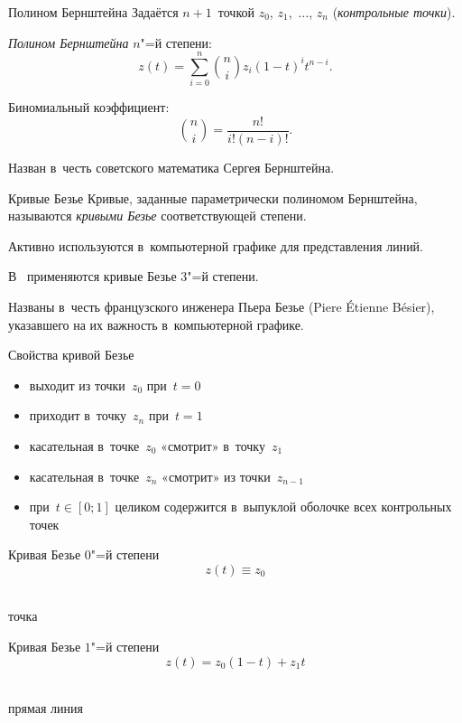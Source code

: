 
\begin{frame}{Полином Бернштейна}
Задаётся $n+1$~точкой $z_0$, $z_1$,~$\ldots$, $z_n$
(\emph{контрольные точки}).

\emph{Полином Бернштейна\/} $n$"=й степени:
	\[
	z(t)=\sum_{i=0}^n\binom niz_i(1-t)^it^{n-i}.
	\]

Биномиальный коэффициент:
	\[
	\binom ni=\frac{n!}{i!(n-i)!}.
	\]

Назван в~честь советского математика Сергея Бернштейна.
\end{frame}

\begin{frame}{Кривые Безье}
Кривые, заданные параметрически полиномом Бернштейна, называются \emph{кривыми
Безье\/} соответствующей степени.

Активно используются в~компьютерной графике для представления линий.

В~ применяются кривые Безье $3$"=й степени.

Названы в~честь французского инженера Пьера Безье (Piere Étienne Bésier),
указавшего на их важность в~компьютерной графике.
\end{frame}

\begin{frame}{Свойства кривой Безье}
\begin{itemize}
\item
выходит из точки~$z_0$ при~$t=0$
\item
приходит в~точку~$z_n$ при~$t=1$
\item
касательная в~точке~$z_0$ «смотрит» в~точку~$z_1$
\item
касательная в~точке~$z_n$ «смотрит» из точки~$z_{n-1}$
\item
при~$t\in[0;1]$ целиком содержится в~выпуклой оболочке всех контрольных точек
\end{itemize}
\end{frame}

\begin{frame}{Кривая Безье $0$"=й степени}
	\[
	z(t)\equiv z_0
	\]
\begin{center}
\\[4ex]
точка
\end{center}
\end{frame}

\begin{frame}{Кривая Безье $1$"=й степени}
	\[
	z(t)=z_0(1-t)+z_1t
	\]
\begin{center}
\\[4ex]
прямая линия
\end{center}
\end{frame}

